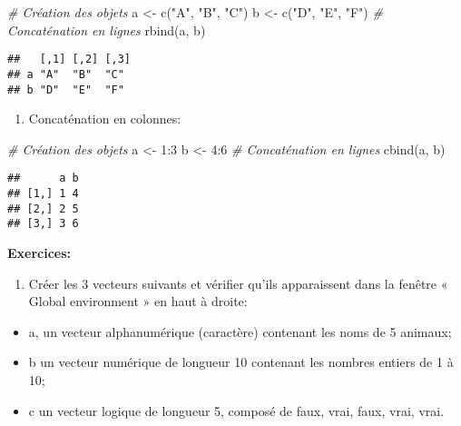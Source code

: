 \documentclass[
]{article}
\newenvironment{Shaded}{\begin{snugshade}}{\end{snugshade}}
\newcommand{\CommentTok}[1]{\textcolor[rgb]{0.56,0.35,0.01}{\textit{#1}}}
\newcommand{\DecValTok}[1]{\textcolor[rgb]{0.00,0.00,0.81}{#1}}
\newcommand{\FunctionTok}[1]{\textcolor[rgb]{0.00,0.00,0.00}{#1}}
\newcommand{\NormalTok}[1]{#1}
\newcommand{\OtherTok}[1]{\textcolor[rgb]{0.56,0.35,0.01}{#1}}
\newcommand{\SpecialCharTok}[1]{\textcolor[rgb]{0.00,0.00,0.00}{#1}}
\newcommand{\StringTok}[1]{\textcolor[rgb]{0.31,0.60,0.02}{#1}}
\providecommand{\tightlist}{%
  \setlength{\itemsep}{0pt}\setlength{\parskip}{0pt}}
\begin{document}
\begin{Shaded}
\begin{Highlighting}[]
\CommentTok{\# Création des objets}
\NormalTok{a }\OtherTok{\textless{}{-}} \FunctionTok{c}\NormalTok{(}\StringTok{"A"}\NormalTok{, }\StringTok{"B"}\NormalTok{, }\StringTok{"C"}\NormalTok{)}
\NormalTok{b }\OtherTok{\textless{}{-}} \FunctionTok{c}\NormalTok{(}\StringTok{"D"}\NormalTok{, }\StringTok{"E"}\NormalTok{, }\StringTok{"F"}\NormalTok{)}
\CommentTok{\# Concaténation en lignes}
\FunctionTok{rbind}\NormalTok{(a, b)}
\end{Highlighting}
\end{Shaded}

\begin{verbatim}
##   [,1] [,2] [,3]
## a "A"  "B"  "C" 
## b "D"  "E"  "F"
\end{verbatim}

\begin{enumerate}
\def\labelenumi{\arabic{enumi}.}
\setcounter{enumi}{1}
\tightlist
\item
  Concaténation en colonnes:
\end{enumerate}

\begin{Shaded}
\begin{Highlighting}[]
\CommentTok{\# Création des objets}
\NormalTok{a }\OtherTok{\textless{}{-}} \DecValTok{1}\SpecialCharTok{:}\DecValTok{3}
\NormalTok{b }\OtherTok{\textless{}{-}} \DecValTok{4}\SpecialCharTok{:}\DecValTok{6}
\CommentTok{\# Concaténation en lignes}
\FunctionTok{cbind}\NormalTok{(a, b)}
\end{Highlighting}
\end{Shaded}

\begin{verbatim}
##      a b
## [1,] 1 4
## [2,] 2 5
## [3,] 3 6
\end{verbatim}

\textbf{Exercices:}

\begin{enumerate}
\def\labelenumi{\arabic{enumi}.}
\tightlist
\item
  Créer les 3 vecteurs suivants et vérifier qu'ils apparaissent dans la fenêtre « Global environment » en haut à droite:
\end{enumerate}

\begin{itemize}
\tightlist
\item
  a, un vecteur alphanumérique (caractère) contenant les noms de 5 animaux;
\item
  b un vecteur numérique de longueur 10 contenant les nombres entiers de 1 à 10;
\item
  c un vecteur logique de longueur 5, composé de faux, vrai, faux, vrai, vrai.
\end{itemize}
\end{document}

